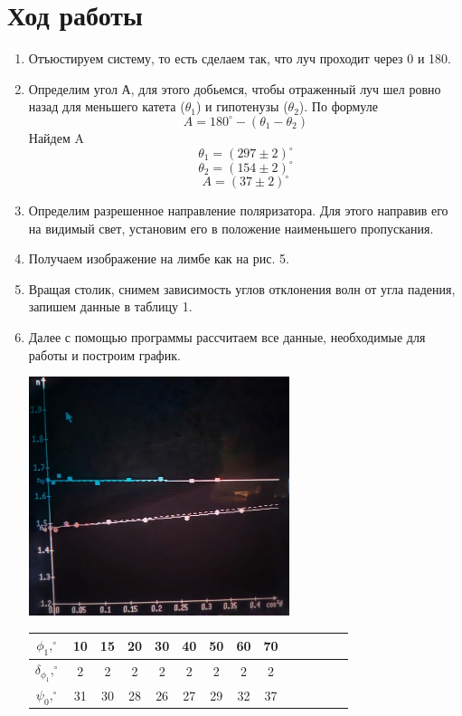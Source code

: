 \documentclass[a4paper, 12pt]{article}%
\begin{document}
\section*{Ход работы}
\begin{enumerate}
\item Отъюстируем систему, то есть сделаем так, что луч проходит через 0 и 180.
\item Определим угол А, для этого добьемся, чтобы отраженный луч шел ровно назад для меньшего катета ($\theta_1$) и гипотенузы ($\theta_2$). По формуле 
\[A = 180^{\circ} - (\theta_1 - \theta_2)\]
Найдем A
\[\theta_1 = (297 \pm 2)^{\circ}\]
\[\theta_2 = (154 \pm 2)^{\circ}\]
\[A = (37 \pm 2)^{\circ}\]
\item Определим разрешенное направление поляризатора. Для этого направив его на видимый свет, установим его в положение наименьшего пропускания.
\item Получаем изображение на лимбе как на рис. 5.
\item Вращая столик, снимем зависимость углов отклонения волн от угла падения, запишем данные в таблицу 1.
\item Далее с помощью программы рассчитаем все данные, необходимые для работы и построим график.
  \begin{center}
    \includegraphics[width = 0.6\textwidth]{3.png}
  \end{center}
\begin{center}
\begin{tabular}{|c|c|c|c|c|c|c|c|c|c|c|c|c|c|}
\hline
$\phi_1, ^{\circ}$             & 10     & 15     & 20     & 30    & 40    & 50     & 60    & 70    \\ \hline
$\delta_{\phi_1}, ^{\circ}$    & 2      & 2      & 2     & 2     & 2     & 2     & 2     & 2     \\ \hline
$\psi_0, ^{\circ}$             & 31     & 30     & 28   & 26     & 27    & 29     & 32    & 37    \\ \hline

\end{tabular}
\end{center}
\end{enumerate}
\end{document}
